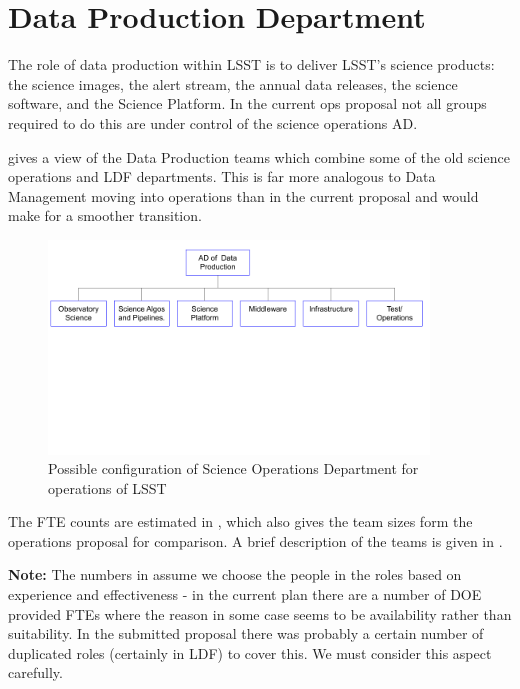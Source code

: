 \newpage
\section{Data Production Department }\label{sec:sciops} \label{sec:dataprod}

The role of data production within \gls{LSST} is to deliver \gls{LSST}'s science products: the science images, the alert stream, the annual data releases, the science \gls{software}, and the \gls{Science Platform}. In the current ops proposal not all groups required to do this are under control of the  science operations \gls{AD}.

 gives a view of the Data Production teams which combine some of the old science operations  and \gls{LDF} departments. This is far more analogous to \gls{Data Management} moving into operations than in the current proposal and would make for a smoother transition.

\begin{figure}
\begin{center}
\includegraphics[width=0.9\textwidth,trim=0cm 10cm 0 0, clip]{figures/SciOpsOrg}
\caption{Possible \gls{configuration} of Science \gls{Operations} Department for operations of \gls{LSST} \label{fig:sciopsorg}}
\end{center}
\end{figure}

The \gls{FTE} counts are estimated in , which also gives the team sizes form the operations proposal for comparison.
A brief description of the teams is given in .


{\bf Note:} The numbers in  assume we choose the people in the roles based on experience and effectiveness - in the current plan there are a number of \gls{DOE} provided FTEs where the reason in some case seems to be availability rather than suitability. In the submitted proposal there was probably a certain number of duplicated roles (certainly in \gls{LDF}) to cover this. We must consider this aspect carefully.





